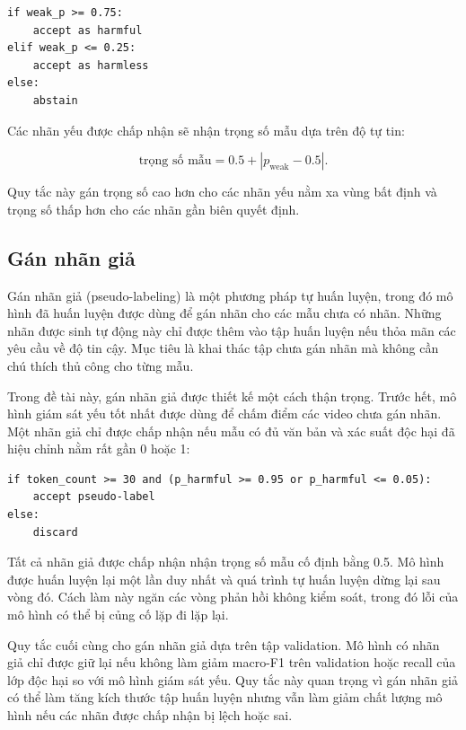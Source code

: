 \begin{verbatim}
if weak_p >= 0.75:
    accept as harmful
elif weak_p <= 0.25:
    accept as harmless
else:
    abstain
\end{verbatim}

Các nhãn yếu được chấp nhận sẽ nhận trọng số mẫu dựa trên độ tự tin:

\begin{equation}
    \text{trọng số mẫu} = 0.5 + |p_{\text{weak}} - 0.5|.
\end{equation}

Quy tắc này gán trọng số cao hơn cho các nhãn yếu nằm xa vùng bất định và trọng số thấp hơn cho các nhãn gần biên quyết định.

\subsection{Gán nhãn giả}

Gán nhãn giả (pseudo-labeling) là một phương pháp tự huấn luyện, trong đó mô hình đã huấn luyện được dùng để gán nhãn cho các mẫu chưa có nhãn. Những nhãn được sinh tự động này chỉ được thêm vào tập huấn luyện nếu thỏa mãn các yêu cầu về độ tin cậy. Mục tiêu là khai thác tập chưa gán nhãn mà không cần chú thích thủ công cho từng mẫu.

Trong đề tài này, gán nhãn giả được thiết kế một cách thận trọng. Trước hết, mô hình giám sát yếu tốt nhất được dùng để chấm điểm các video chưa gán nhãn. Một nhãn giả chỉ được chấp nhận nếu mẫu có đủ văn bản và xác suất độc hại đã hiệu chỉnh nằm rất gần 0 hoặc 1:

\begin{verbatim}
if token_count >= 30 and (p_harmful >= 0.95 or p_harmful <= 0.05):
    accept pseudo-label
else:
    discard
\end{verbatim}

Tất cả nhãn giả được chấp nhận nhận trọng số mẫu cố định bằng 0.5. Mô hình được huấn luyện lại một lần duy nhất và quá trình tự huấn luyện dừng lại sau vòng đó. Cách làm này ngăn các vòng phản hồi không kiểm soát, trong đó lỗi của mô hình có thể bị củng cố lặp đi lặp lại.

Quy tắc cuối cùng cho gán nhãn giả dựa trên tập validation. Mô hình có nhãn giả chỉ được giữ lại nếu không làm giảm macro-F1 trên validation hoặc recall của lớp độc hại so với mô hình giám sát yếu. Quy tắc này quan trọng vì gán nhãn giả có thể làm tăng kích thước tập huấn luyện nhưng vẫn làm giảm chất lượng mô hình nếu các nhãn được chấp nhận bị lệch hoặc sai.


